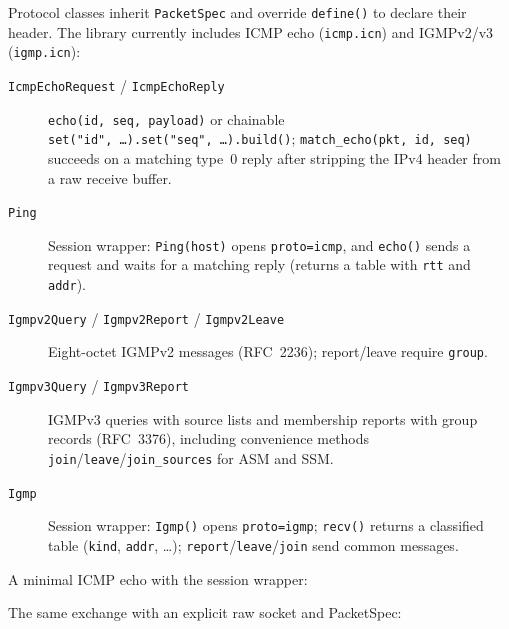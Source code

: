 Protocol classes inherit \texttt{PacketSpec} and override
\texttt{define()} to declare their header. The library currently
includes ICMP echo (\texttt{icmp.icn}) and IGMPv2/v3
(\texttt{igmp.icn}):

\begin{description}
\item[\texttt{IcmpEchoRequest} / \texttt{IcmpEchoReply}]
\texttt{echo(id, seq, payload)} or chainable
\texttt{set("id",~…)\allowbreak.set("seq",~…)\allowbreak.build()};
\texttt{match\_echo(pkt, id, seq)} succeeds on a matching type~0
reply after stripping the IPv4 header from a raw receive buffer.
\item[\texttt{Ping}]
Session wrapper: \texttt{Ping(host)} opens
\texttt{proto=icmp}, and \texttt{echo()} sends a request and waits
for a matching reply (returns a table with \texttt{rtt} and
\texttt{addr}).
\item[\texttt{Igmpv2Query} / \texttt{Igmpv2Report} / \texttt{Igmpv2Leave}]
Eight-octet IGMPv2 messages (RFC~2236); report/leave require
\texttt{group}.
\item[\texttt{Igmpv3Query} / \texttt{Igmpv3Report}]
IGMPv3 queries with source lists and membership reports with group
records (RFC~3376), including convenience methods
\texttt{join}/\texttt{leave}/\texttt{join\_sources} for ASM and SSM.
\item[\texttt{Igmp}]
Session wrapper: \texttt{Igmp()} opens \texttt{proto=igmp};
\texttt{recv()} returns a classified table (\texttt{kind},
\texttt{addr}, \ldots); \texttt{report}/\texttt{leave}/\texttt{join}
send common messages.
\end{description}

A minimal ICMP echo with the session wrapper:


The same exchange with an explicit raw socket and PacketSpec:

